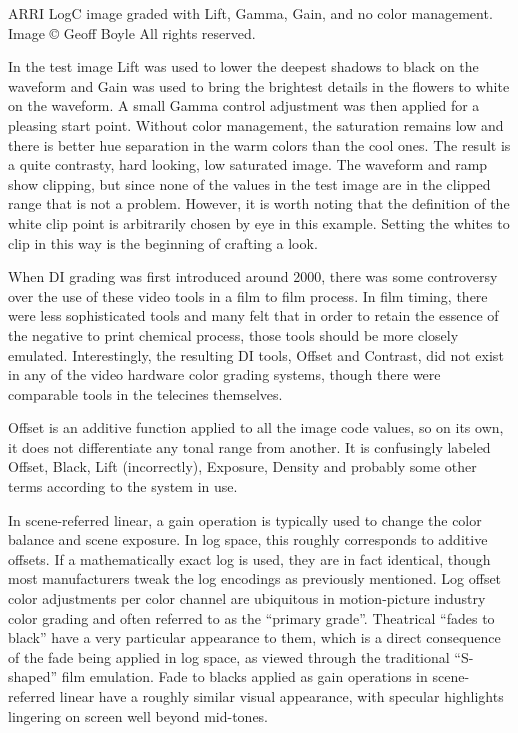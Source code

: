 ARRI LogC image graded with Lift, Gamma, Gain, and no color management. Image © Geoff Boyle All rights reserved.

In the test image Lift was used to lower the deepest shadows to black on the waveform and Gain was used to bring the brightest details in the flowers to white on the waveform. A small Gamma control adjustment was then applied for a pleasing start point. Without color management, the saturation remains low and there is better hue separation in the warm colors than the cool ones. The result is a quite contrasty, hard looking, low saturated image. The waveform and ramp show clipping, but since none of the values in the test image are in the clipped range that is not a problem. However, it is worth noting that the definition of the white clip point is arbitrarily chosen by eye in this example. Setting the whites to clip in this way is the beginning of crafting a look.

When DI grading was first introduced around 2000, there was some controversy over the use of these video tools in a film to film process. In film timing, there were less sophisticated tools and many felt that in order to retain the essence of the negative to print chemical process, those tools should be more closely emulated. Interestingly, the resulting DI tools, Offset and Contrast, did not exist in any of the video hardware color grading systems, though there were comparable tools in the telecines themselves.

Offset is an additive function applied to all the image code values, so on its own, it does not differentiate any tonal range from another. It is confusingly labeled Offset, Black, Lift (incorrectly), Exposure, Density and probably some other terms according to the system in use.

In scene-referred linear, a gain operation is typically used to change the color balance and scene exposure. In log space, this roughly corresponds to additive offsets. If a mathematically exact log is used, they are in fact identical, though most manufacturers tweak the log encodings as previously mentioned. Log offset color adjustments per color channel are ubiquitous in motion-picture industry color grading and often referred to as the “primary grade”. Theatrical “fades to black” have a very particular appearance to them, which is a direct consequence of the fade being applied in log space, as viewed through the traditional “S-shaped” film emulation. Fade to blacks applied as gain operations in scene-referred linear have a roughly similar visual appearance, with specular highlights lingering on screen well beyond mid-tones.


